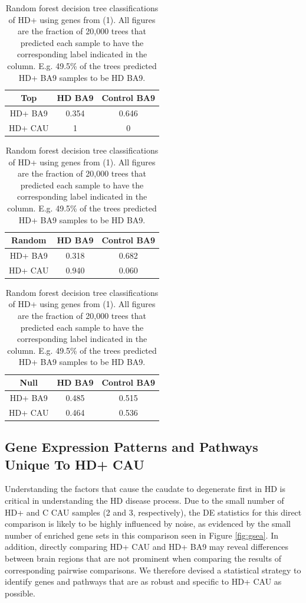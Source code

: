 \documentclass[fleqn,10pt,table]{wlscirep}
\begin{document}
\begin{table}[ht]
\begin{subtable}{.5\linewidth}
\centering
\begin{tabular}{ccc} \hline
Top 		& HD BA9 	& Control BA9   \\ \hline
HD+ BA9   	& 0.354 	& 0.646			\\
HD+ CAU   	& 1			& 0			\\ \hline
\end{tabular}
\caption{Trees built with top 250 DE genes from (1)}
\end{subtable}
\begin{subtable}{.5\linewidth}
\centering
\begin{tabular}{ccc} \hline
Random   	& HD BA9 	& Control BA9		\\ \hline
HD+ BA9   	& 0.318 	& 0.682			\\
HD+ CAU   	& 0.940		& 0.060			\\ \hline
\end{tabular}
\caption{Trees built with 250 random genes from (1)}
\end{subtable}
\begin{subtable}{.5\linewidth}
\centering
\begin{tabular}{ccc} \hline
Null 		& HD BA9 	& Control BA9		\\ \hline
HD+ BA9   	& 0.485		& 0.515		\\
HD+ CAU   	& 0.464		& 0.536		\\ \hline
\end{tabular}
\caption{Trees built with 250 random genes from (1) and shuffled labels}
\end{subtable}
\caption{Random forest decision tree classifications of HD+ using genes from (1). All figures are the fraction of 20,000 trees that predicted each sample to have the corresponding label indicated in the column. E.g. 49.5\% of the trees predicted HD+ BA9 samples to be HD BA9. \label{tab:rf_predict}}
\end{table} 

\subsection{Gene Expression Patterns and Pathways Unique To HD+ CAU}

Understanding the factors that cause the caudate to degenerate first in HD is critical in understanding the HD disease process.
Due to the small number of HD+ and C CAU samples (2 and 3, respectively), the DE statistics for this direct comparison is likely to be highly influenced by noise, as evidenced by the small number of enriched gene sets in this comparison seen in Figure \ref{fig:gsea}.
In addition, directly comparing HD+ CAU and HD+ BA9 may reveal differences between brain regions that are not prominent when comparing the results of corresponding pairwise comparisons.
We therefore devised a statistical strategy to identify genes and pathways that are as robust and specific to HD+ CAU as possible.
\end{document}
